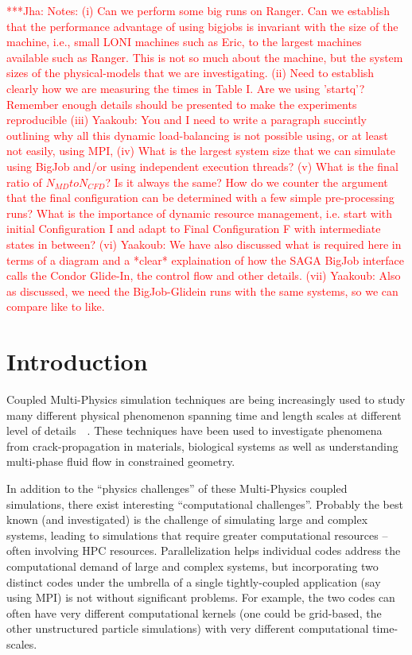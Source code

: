 \documentclass[conference,final]{IEEEtran}
\newcommand{\jhanote}[1]{ {\textcolor{red} { ***Jha: #1 }}}
\newcommand{\jhanote}[1]{}
\begin{document}
\jhanote{Notes: (i) Can we perform some big runs on Ranger. Can we
  establish that the performance advantage of using bigjobs is
  invariant with the size of the machine, i.e., small LONI machines
  such as Eric, to the largest machines available such as Ranger. This
  is not so much about the machine, but the system sizes of the
  physical-models that we are investigating. (ii) Need to establish
  clearly how we are measuring the times in Table I. Are we using
  'startq'? Remember enough details should be presented to make the
  experiments reproducible (iii) Yaakoub: You and I need to write a
  paragraph succintly outlining why all this dynamic load-balancing is
  not possible using, or at least not easily, using MPI, (iv) What is
  the largest system size that we can simulate using BigJob and/or
  using independent execution threads? (v) What is the final ratio of
  $N_{MD} to N_{CFD}$? Is it always the same? How do we counter the
  argument that the final configuration can be determined with a few
  simple pre-processing runs? What is the importance of dynamic
  resource management, i.e. start with initial Configuration I and
  adapt to Final Configuration F with intermediate states in between?
  (vi) Yaakoub: We have also discussed what is required here in terms
  of a diagram and a *clear* explaination of how the SAGA BigJob
  interface calls the Condor Glide-In, the control flow and other
  details. (vii) Yaakoub: Also as discussed, we need the
  BigJob-Glidein runs with the same systems, so we can compare like to
  like.}


\section{Introduction}

Coupled Multi-Physics simulation techniques are being increasingly
used to study many different physical phenomenon spanning time and
length scales at different level of
details~\cite{Tai}~\cite{Watanabe}. These techniques have been used to
investigate phenomena from crack-propagation in materials, biological
systems as well as understanding multi-phase fluid flow in constrained
geometry.

In addition to the ``physics challenges'' of these Multi-Physics
coupled simulations, there exist interesting ``computational
challenges''. Probably the best known (and investigated) is the
challenge of simulating large and complex systems, leading to
simulations that require greater computational resources -- often
involving HPC resources. %
Parallelization helps individual codes address the computational
demand of large and complex systems, but incorporating two distinct
codes under the umbrella of a single tightly-coupled application (say
using MPI) is not without significant problems. For example, the two
codes can often have very different computational kernels (one could
be grid-based, the other unstructured particle simulations) with very
different computational time-scales.
\end{document}
